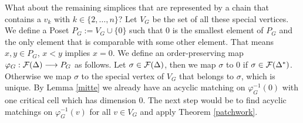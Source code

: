 \documentclass{elsarticle}
\begin{document}
What about the remaining simplices that are represented by a chain that contains a $v_k$ with $k\in\{2,\ldots, n\}$? Let $V_G$ be the set of all these special vertices. We define a Poset $P_G:=V_G\cup\{0\}$ such that $0$ is the smallest element of $P_G$ and the only element that is comparable with some other element. That means $x,y\in P_G$, $x<y$ implies $x=0$. We define an order-preserving map $\varphi_G:{\cal F}(\Delta)\longrightarrow P_G$ as follows. Let $\sigma\in{\cal F}(\Delta)$, then we map $\sigma$ to $0$ if $\sigma\in{\cal F}(\Delta^*)$. Otherwise we map $\sigma$ to the special vertex of $V_G$ that belongs to $\sigma$, which is unique. By Lemma \ref{mitte} we already have an acyclic matching on $\varphi_G^{-1}(0)$ with one critical cell which has dimension $0$. The next step would be to find acyclic matchings on $\varphi_G^{-1}(v)$ for all $v\in V_G$ and apply Theorem \ref{patchwork}.
\end{document}
